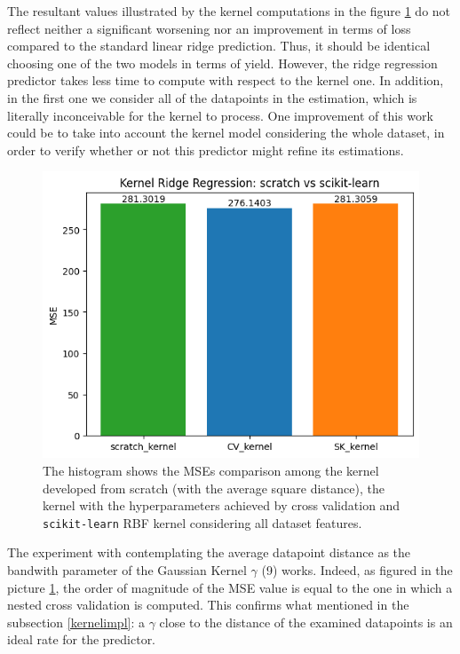\documentclass{article}
\begin{document}
The resultant values illustrated by the kernel computations in the figure \ref{KRRcomparison} do not reflect neither a significant worsening nor an improvement in terms of loss compared to the standard linear ridge prediction. Thus, it should be identical choosing one of the two models in terms of yield. However, the ridge regression predictor takes less time to compute with respect to the kernel one. In addition, in the first one we consider all of the datapoints in the estimation, which is literally inconceivable for the kernel to process. One improvement of this work could be to take into account the kernel model considering the whole dataset, in order to verify whether or not this predictor might refine its estimations. 

\begin{figure}[H]
	\begin{adjustwidth}{0 cm}{}
		\begin{center}
			\includegraphics[scale= 0.53]{images/finalKernel.png}
		\end{center}
	\end{adjustwidth}
	\caption{The histogram shows the MSEs comparison among the kernel developed from scratch (with the average square distance), the kernel with the hyperparameters achieved by cross validation and \texttt{scikit-learn} RBF kernel \cite{rbf} considering all dataset features.}
	\label{KRRcomparison}
\end{figure}

The experiment with contemplating the average datapoint distance as the bandwith parameter of the Gaussian Kernel $\gamma$ (9) works. Indeed, as figured in the picture \ref{KRRcomparison}, the order of magnitude of the MSE value is equal to the one in which a nested cross validation is computed. This confirms what mentioned in the subsection \ref{kernelimpl}: a $\gamma$ close to the distance of the examined datapoints is an ideal rate for the predictor. 
\end{document}

